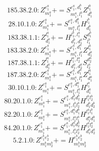 \documentclass[letterpaper,10pt,fleqn,leqno,onecolumn]{article}
\begin{document}
\begin{equation} \;\;\;\;\;\;  185.38.2.0: Z^{e_{1}^{a}}_{m_{1}^{a}}+=S^{e_{1}^{a},d_{1}^{b}}_{m_{1}^{a},l_{1}^{b}}Z^{l_{1}^{b}}_{d_{1}^{b}} \end{equation}
\begin{equation} \;\;\;\;\;\;  28.10.1.0: Z^{e_{1}^{a}}_{m_{1}^{a}}+=S^{e_{1}^{a},d_{1}^{b}}_{m_{1}^{a},l_{1}^{b}}H^{l_{1}^{b}}_{d_{1}^{b}} \end{equation}
\begin{equation} \;\;\;\;\;\;  183.38.1.1: Z^{l_{1}^{a}}_{d_{1}^{a}}+=H^{l_{1}^{b},l_{1}^{a}}_{d_{1}^{b},d_{1}^{a}}S^{d_{1}^{b}}_{l_{1}^{b}} \end{equation}
\begin{equation} \;\;\;\;\;\;  183.38.2.0: Z^{e_{1}^{a}}_{m_{1}^{a}}+=S^{e_{1}^{a},d_{1}^{a}}_{m_{1}^{a},l_{1}^{a}}Z^{l_{1}^{a}}_{d_{1}^{a}} \end{equation}
\begin{equation} \;\;\;\;\;\;  187.38.1.1: Z^{l_{1}^{a}}_{d_{1}^{a}}+=H^{l_{1}^{a},l_{2}^{a}}_{d_{1}^{a},d_{2}^{a}}S^{d_{2}^{a}}_{l_{2}^{a}} \end{equation}
\begin{equation} \;\;\;\;\;\;  187.38.2.0: Z^{e_{1}^{a}}_{m_{1}^{a}}+=S^{e_{1}^{a},d_{1}^{a}}_{m_{1}^{a},l_{1}^{a}}Z^{l_{1}^{a}}_{d_{1}^{a}} \end{equation}
\begin{equation} \;\;\;\;\;\;  30.10.1.0: Z^{e_{1}^{a}}_{m_{1}^{a}}+=S^{e_{1}^{a},d_{1}^{a}}_{m_{1}^{a},l_{1}^{a}}H^{l_{1}^{a}}_{d_{1}^{a}} \end{equation}
\begin{equation} \;\;\;\;\;\;  80.20.1.0: Z^{e_{1}^{a}}_{m_{1}^{a}}+=S^{e_{1}^{a},d_{1}^{b}d_{2}^{b}}_{m_{1}^{a},l_{1}^{b}l_{2}^{b}}H^{l_{1}^{b}l_{2}^{b}}_{d_{1}^{b}d_{2}^{b}} \end{equation}
\begin{equation} \;\;\;\;\;\;  82.20.1.0: Z^{e_{1}^{a}}_{m_{1}^{a}}+=S^{e_{1}^{a},d_{1}^{a}d_{1}^{b}}_{m_{1}^{a},l_{1}^{a}l_{1}^{b}}H^{l_{1}^{a}l_{1}^{b}}_{d_{1}^{a}d_{1}^{b}} \end{equation}
\begin{equation} \;\;\;\;\;\;  84.20.1.0: Z^{e_{1}^{a}}_{m_{1}^{a}}+=S^{e_{1}^{a},d_{1}^{a}d_{2}^{a}}_{m_{1}^{a},l_{1}^{a}l_{2}^{a}}H^{l_{1}^{a}l_{2}^{a}}_{d_{1}^{a}d_{2}^{a}} \end{equation}
\begin{equation} \;\;\;\;\;\;  5.2.1.0: Z^{e_{1}^{b}e_{2}^{b}}_{m_{1}^{b}m_{2}^{b}}+=H^{e_{1}^{b}e_{2}^{b}}_{m_{1}^{b}m_{2}^{b}} \end{equation}
\end{document}
